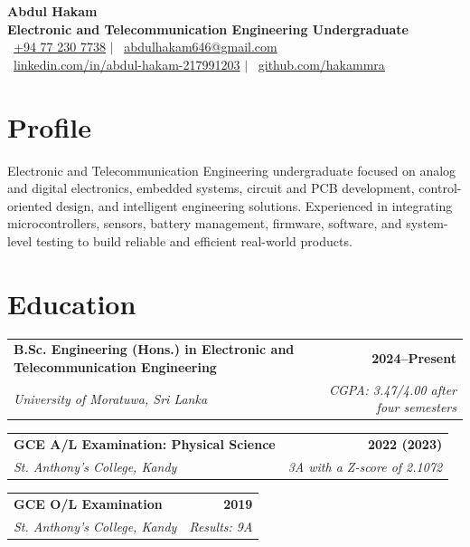 \documentclass[a4paper,10pt]{article}
\makeatletter
\newcommand{\educationEntry}[4]{%
  \begin{tabularx}{\textwidth}{@{}Xr@{}}
    \textbf{#1} & \textbf{\small #2} \\
    \textit{#3} & \textit{\small #4}
  \end{tabularx}
}
\makeatother
\begin{document}
\fontsize{9.5}{11.25}\selectfont

\begin{center}
  {\LARGE\bfseries Abdul Hakam}\\[0.75mm]
  {\large\bfseries Electronic and Telecommunication Engineering Undergraduate}\\[1.5mm]

  \small
  \faPhone\ \href{tel:+94772307738}{+94 77 230 7738}
  \quad $\vert$ \quad
  \faEnvelope\ \href{mailto:abdulhakam646@gmail.com}{abdulhakam646@gmail.com}\\[0.8mm]

  \faLinkedin\ 
  \href{https://www.linkedin.com/in/abdul-hakam-217991203}
  {linkedin.com/in/abdul-hakam-217991203}
  \quad $\vert$ \quad
  \faGithub\ 
  \href{https://github.com/hakammra}
  {github.com/hakammra}
\end{center}

\vspace{-1.2mm}

\section{Profile}
Electronic and Telecommunication Engineering undergraduate focused on analog and digital electronics, embedded systems, circuit and PCB development, control-oriented design, and intelligent engineering solutions. Experienced in integrating microcontrollers, sensors, battery management, firmware, software, and system-level testing to build reliable and efficient real-world products.
\section{Education}
\educationEntry
  {B.Sc. Engineering (Hons.) in Electronic and Telecommunication Engineering}
  {2024--Present}
  {University of Moratuwa, Sri Lanka}
  {CGPA: 3.47/4.00 after four semesters}

\vspace{1.35mm}
\educationEntry
  {GCE A/L Examination: Physical Science}
  {2022 (2023)}
  {St. Anthony's College, Kandy}
  {3A with a Z-score of 2.1072}

\vspace{1.35mm}
\educationEntry
  {GCE O/L Examination}
  {2019}
  {St. Anthony's College, Kandy}
  {Results: 9A}
\end{document}
